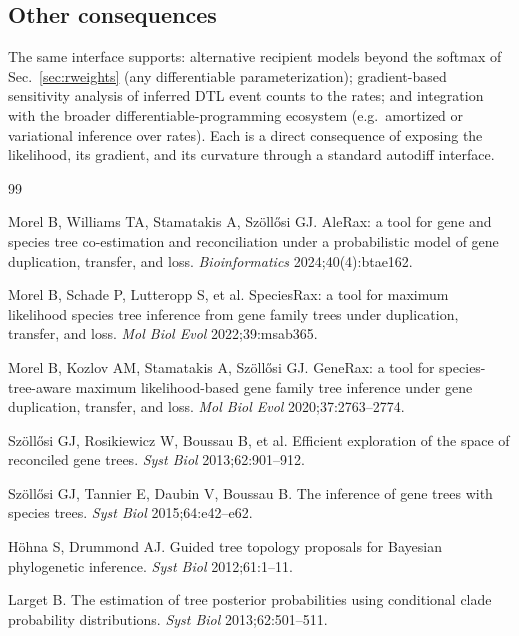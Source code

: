 \documentclass[11pt]{article}
\begin{document}
\subsection{Other consequences}
\label{app:other}
The same interface supports: alternative recipient models beyond the softmax of
Sec.~\ref{sec:rweights} (any differentiable parameterization); gradient-based
sensitivity analysis of inferred DTL event counts to the rates; and integration
with the broader differentiable-programming ecosystem (e.g.\ amortized or
variational inference over rates). Each is a direct consequence of exposing the
likelihood, its gradient, and its curvature through a standard autodiff
interface.

\begin{thebibliography}{99}
\small

 Morel B, Williams TA, Stamatakis A, Sz\"oll\H{o}si GJ.
AleRax: a tool for gene and species tree co-estimation and reconciliation under
a probabilistic model of gene duplication, transfer, and loss.
\emph{Bioinformatics} 2024;40(4):btae162.

 Morel B, Schade P, Lutteropp S, et al. SpeciesRax: a tool
for maximum likelihood species tree inference from gene family trees under
duplication, transfer, and loss. \emph{Mol Biol Evol} 2022;39:msab365.

 Morel B, Kozlov AM, Stamatakis A, Sz\"oll\H{o}si GJ.
GeneRax: a tool for species-tree-aware maximum likelihood-based gene family tree
inference under gene duplication, transfer, and loss.
\emph{Mol Biol Evol} 2020;37:2763--2774.

 Sz\"oll\H{o}si GJ, Rosikiewicz W, Boussau B, et al.
Efficient exploration of the space of reconciled gene trees.
\emph{Syst Biol} 2013;62:901--912.

 Sz\"oll\H{o}si GJ, Tannier E, Daubin V, Boussau B. The
inference of gene trees with species trees. \emph{Syst Biol} 2015;64:e42--e62.

 H\"ohna S, Drummond AJ. Guided tree topology proposals for
Bayesian phylogenetic inference. \emph{Syst Biol} 2012;61:1--11.

 Larget B. The estimation of tree posterior probabilities
using conditional clade probability distributions.
\emph{Syst Biol} 2013;62:501--511.


\end{thebibliography}
\end{document}
